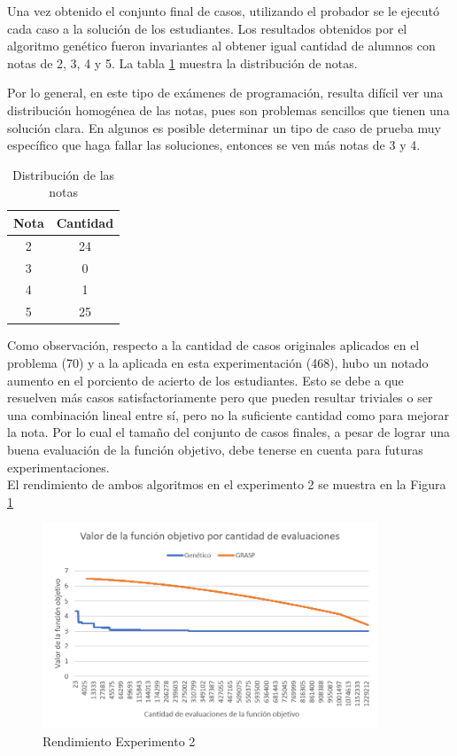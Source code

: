 \documentclass[a4paper,openright,11pt,oneside]{book}
\begin{document}
	Una vez obtenido el conjunto final de casos, utilizando el probador se le ejecutó cada caso a la solución de los estudiantes. Los resultados obtenidos por el algoritmo genético fueron invariantes al obtener igual cantidad de alumnos con notas de 2, 3, 4 y 5. La tabla \ref{tab:Notas} muestra la distribución de notas.
	
	Por lo general, en este tipo de exámenes de programación, resulta difícil ver una distribución homogénea de las notas, pues son problemas sencillos que tienen una solución clara. En algunos es posible determinar un tipo de caso de prueba muy específico que haga fallar las soluciones, entonces se ven más notas de 3 y 4.
	
	\begin{table}[h]
		\begin{center}
			\begin{tabular}{| c | c |} \hline
				Nota & Cantidad \\ \hline
				2 & 24\\ 
				3 & 0 \\
				4 & 1 \\
				5 & 25 \\ \hline
			\end{tabular}
			\caption{Distribución de las notas}
			\label{tab:Notas}
		\end{center}
	\end{table}

	Como observación, respecto a la cantidad de casos originales aplicados en el problema (70) y a la aplicada en esta experimentación (468), hubo un notado aumento en el porciento de acierto de los estudiantes. Esto se debe a que resuelven más casos satisfactoriamente pero que pueden resultar triviales o ser una combinación lineal entre sí, pero no la suficiente cantidad como para mejorar la nota. Por lo cual el tamaño del conjunto de casos finales, a pesar de lograr una buena evaluación de la función objetivo, debe tenerse en cuenta para futuras experimentaciones. \\
	
	El rendimiento de ambos algoritmos en el experimento 2 se muestra en la Figura \ref{CallsAna}
	
	\begin{figure}[h!]
		\centering
		\includegraphics[width=10cm]{./Graphics/Calls-Anagramas.png}
		\caption{Rendimiento Experimento 2}
		\label{CallsAna}
	\end{figure}
	
\end{document}
